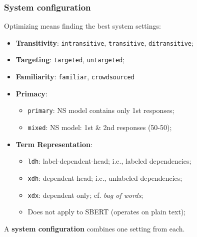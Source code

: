 \documentclass[xcolor={dvipsnames}]{beamer}
\newcommand{\param}[1]{\texttt{#1}}
\begin{document}
\begin{frame}
\frametitle{System configuration}
\small

\vspace{.8em}
Optimizing means finding the best system settings:

\begin{itemize}
\pause
\item \textbf{Transitivity}: \param{intransitive}, \param{transitive}, \param{ditransitive};
\pause
\item \textbf{Targeting}: \param{targeted}, \param{untargeted};
\pause
\item \textbf{Familiarity}: \param{familiar}, \param{crowdsourced}
\pause
\item \textbf{Primacy}:
\begin{itemize}
\item \param{primary}: NS model contains only 1st responses;
\item \param{mixed}: NS model: 1st \& 2nd responses (50-50);
\end{itemize}
\pause
\item \textbf{Term Representation}:
\begin{itemize}
\item \param{ldh}: label-dependent-head; i.e., labeled dependencies;
\item \param{xdh}: dependent-head; i.e., unlabeled dependencies;
\item \param{xdx}: dependent only; cf. \textit{bag of words};
\item Does not apply to SBERT (operates on plain text);
\end{itemize}
\end{itemize}

\vspace{.3em}
\pause
A \textbf{system configuration} combines one setting from each.

\end{frame}




%
%
\end{document}
